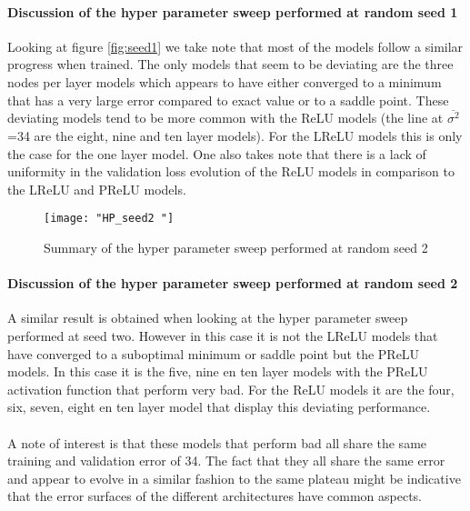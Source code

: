 \documentclass[12pt]{article}
\begin{document}
\paragraph{Discussion of the hyper parameter sweep performed at  random seed 1}
Looking at figure \ref{fig:seed1} we take note that most of the models follow a similar progress when trained. The only models that seem to be deviating are the three nodes per layer models which appears to have either converged to a minimum that has a very large error compared to exact value  or to a saddle point. These deviating models tend to be more common with the ReLU models (the line at $\overline{\sigma^2}$=34 are the eight, nine and ten layer models). For the LReLU models this is only the case for the one layer model. One also takes note that there is a lack of uniformity in the validation loss evolution of the ReLU models in comparison to the LReLU and PReLU models.

\begin{figure}[H]
	\centering
	\texttt{[image: "HP\_seed2 "]}
	\caption{Summary of the hyper parameter sweep performed at random seed 2}
	\label{fig:seed2}
\end{figure}

\paragraph{Discussion of the hyper parameter sweep performed at random seed 2}
A similar result is obtained when looking at the hyper parameter sweep performed at seed two. However in this case it is not the LReLU models that have converged to a suboptimal minimum or saddle point but the PReLU models. In this case it is the five, nine en ten layer models with the PReLU activation function that perform very bad. For the ReLU models it are the four, six, seven, eight en ten layer model that display this deviating performance.
\\
\\
A note of interest is that these models that perform bad all share the same training and validation error of 34. The fact that they all share the same error and appear to evolve in a similar fashion to the same plateau might be indicative that the error surfaces of the different architectures have common aspects.
\end{document}
